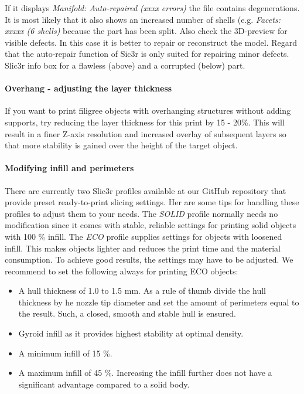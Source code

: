 If it displays \emph{Manifold: Auto-repaired (xxxx errors)} the file contains degenerations.
It is most likely that it also shows an increased number of shells (e.g. \emph{Facets: xxxxx (6 shells)} because the part has been split.
Also check the 3D-preview for visible defects. In this case it is better to repair or reconstruct the model.
Regard that the auto-repair function of Sic3r is only suited for repairing minor defects.
Slic3r info box for a flawless (above) and a corrupted (below) part.


\paragraph{Overhang - adjusting the layer thickness}

If you want to print filigree objects with overhanging structures without adding supports, try reducing the layer thickness for this print by 15 - 20\%. This will result in a finer Z-axis resolution and increased overlay of subsequent layers so that more stability is gained over the height of the target object. 

\paragraph{Modifying infill and perimeters}

There are currently two Slic3r profiles available at our GitHub repository that provide preset ready-to-print slicing settings. Her are some tips for handling these profiles to adjust them to your needs.
The \emph{SOLID} profile normally needs no modification since it comes with stable, reliable settings for printing solid objects with 100 \% infill.
The \emph{ECO} profile supplies settings for objects with loosened infill. This makes objects lighter and reduces the print time and the material consumption. To achieve good results, the settings may have to be adjusted.
We recommend to set the following always for printing ECO objects: 

\begin{itemize}
  \item A hull thickness of 1.0 to 1.5 mm. As a rule of thumb divide the hull thickness by 
        he nozzle tip diameter and set the amount of perimeters equal to the result. Such, a closed, smooth and stable hull is ensured.
  \item Gyroid infill as it provides highest stability at optimal density.
  \item A minimum infill of 15 \%.
  \item A maximum infill of 45 \%. 
        Increasing the infill further does not have a significant advantage compared to a solid body.  
\end{itemize}


